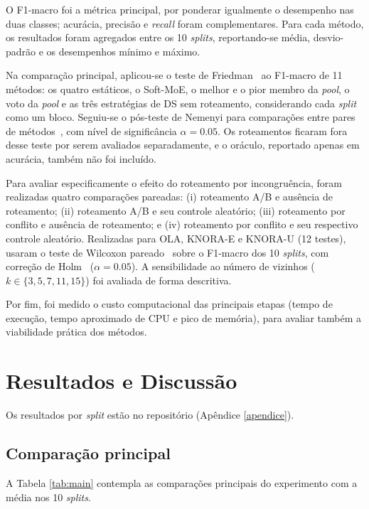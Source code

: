 \documentclass[conference]{IEEEtran}
\begin{document}
O F1-macro foi a métrica principal, por ponderar igualmente o desempenho nas duas classes; acurácia, precisão e \textit{recall} foram complementares. Para cada método, os resultados foram agregados entre os 10 \textit{splits}, reportando-se média, desvio-padrão e os desempenhos mínimo e máximo.

Na comparação principal, aplicou-se o teste de Friedman~\cite{friedman1937use} ao F1-macro de 11 métodos: os quatro estáticos, o Soft-MoE, o melhor e o pior membro da \textit{pool}, o voto da \textit{pool} e as três estratégias de DS sem roteamento, considerando cada \textit{split} como um bloco. Seguiu-se o pós-teste de Nemenyi para comparações entre pares de métodos~\cite{demsar2006statistical}, com nível de significância $\alpha=0.05$. Os roteamentos ficaram fora desse teste por serem avaliados separadamente, e o oráculo, reportado apenas em acurácia, também não foi incluído.

Para avaliar especificamente o efeito do roteamento por incongruência, foram realizadas quatro comparações pareadas: (i) roteamento A/B e ausência de roteamento; (ii) roteamento A/B e seu controle aleatório; (iii) roteamento por conflito e ausência de roteamento; e (iv) roteamento por conflito e seu respectivo controle aleatório. Realizadas para OLA, KNORA-E e KNORA-U (12 testes), usaram o teste de Wilcoxon pareado~\cite{wilcoxon1945individual} sobre o F1-macro dos 10 \textit{splits}, com correção de Holm~\cite{holm1979simple} ($\alpha=0.05$). A sensibilidade ao número de vizinhos ($k \in \{3,5,7,11,15\}$) foi avaliada de forma descritiva.

Por fim, foi medido o custo computacional das principais etapas (tempo de execução, tempo aproximado de CPU e pico de memória), para avaliar também a viabilidade prática dos métodos.

\section{Resultados e Discussão}
\label{sec:results}

Os resultados por \textit{split} estão no repositório (Apêndice \ref{apendice}).

\subsection{Comparação principal}

A Tabela \ref{tab:main} contempla as comparações principais do experimento com a média nos 10 \textit{splits}.
\end{document}
